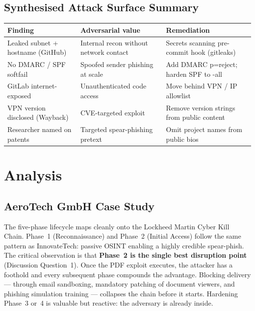\documentclass[11pt,a4paper]{article}
\begin{document}
\subsection{Synthesised Attack Surface Summary}

\small
\begin{tabularx}{\linewidth}{l >{\raggedright\arraybackslash}X >{\raggedright\arraybackslash}X}
\toprule
Finding & Adversarial value & Remediation \\
\midrule
Leaked subnet + hostname (GitHub) & Internal recon without network contact & Secrets scanning pre-commit hook (gitleaks) \\
No DMARC / SPF softfail           & Spoofed sender phishing at scale      & Add DMARC p=reject; harden SPF to -all \\
GitLab internet-exposed           & Unauthenticated code access           & Move behind VPN / IP allowlist \\
VPN version disclosed (Wayback)   & CVE-targeted exploit                  & Remove version strings from public content \\
Researcher named on patents       & Targeted spear-phishing pretext       & Omit project names from public bios \\
\bottomrule
\end{tabularx}
\normalsize


\section{Analysis}

\subsection{AeroTech GmbH Case Study}

The five-phase lifecycle maps cleanly onto the Lockheed Martin Cyber Kill Chain.
Phase~1 (Reconnaissance) and Phase~2 (Initial Access) follow the same pattern as
InnovateTech: passive OSINT enabling a highly credible spear-phish.  The critical
observation is that \textbf{Phase~2 is the single best disruption point} (Discussion
Question~1).  Once the PDF exploit executes, the attacker has a foothold and every
subsequent phase compounds the advantage.  Blocking delivery --- through email sandboxing,
mandatory patching of document viewers, and phishing simulation training --- collapses the
chain before it starts.  Hardening Phase~3 or~4 is valuable but reactive: the adversary
is already inside.
\end{document}
